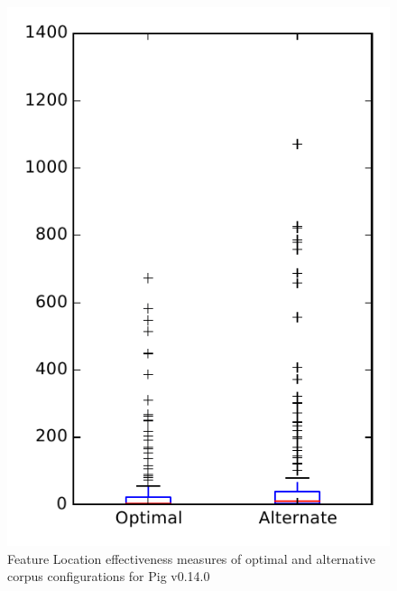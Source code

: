 
\begin{figure}
\centering
\includegraphics[height=0.4\textheight]{figures/combo/flt_rq2_pig}
\caption{Feature Location effectiveness measures of optimal and alternative corpus configurations for Pig v0.14.0}
\label{fig:combo:flt:rq2:pig}
\end{figure}
